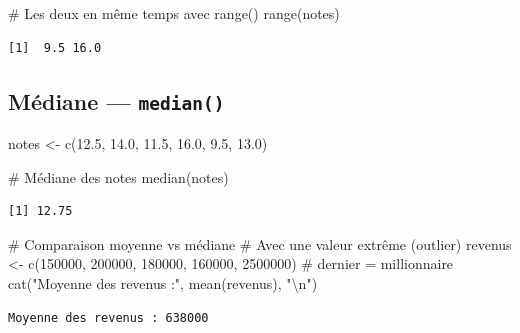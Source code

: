 \documentclass[
  french,
  11pt,
  a4paper,
]{article}
\newenvironment{Shaded}{}{}
\newcommand{\CommentTok}[1]{\textcolor[rgb]{0.42,0.45,0.49}{#1}}
\newcommand{\DecValTok}[1]{\textcolor[rgb]{0.00,0.36,0.77}{#1}}
\newcommand{\FloatTok}[1]{\textcolor[rgb]{0.00,0.36,0.77}{#1}}
\newcommand{\FunctionTok}[1]{\textcolor[rgb]{0.44,0.26,0.76}{#1}}
\newcommand{\NormalTok}[1]{\textcolor[rgb]{0.14,0.16,0.18}{#1}}
\newcommand{\OtherTok}[1]{\textcolor[rgb]{0.44,0.26,0.76}{#1}}
\newcommand{\SpecialCharTok}[1]{\textcolor[rgb]{0.00,0.36,0.77}{#1}}
\newcommand{\StringTok}[1]{\textcolor[rgb]{0.01,0.18,0.38}{#1}}
\begin{document}
\begin{Shaded}
\begin{Highlighting}[]
\CommentTok{\# Les deux en même temps avec range()}
\FunctionTok{range}\NormalTok{(notes)}
\end{Highlighting}
\end{Shaded}

\begin{verbatim}
[1]  9.5 16.0
\end{verbatim}

\subsection{\texorpdfstring{Médiane ---
\texttt{median()}}{Médiane --- median()}}\label{muxe9diane-median}

\begin{Shaded}
\begin{Highlighting}[]
\NormalTok{notes }\OtherTok{\textless{}{-}} \FunctionTok{c}\NormalTok{(}\FloatTok{12.5}\NormalTok{, }\FloatTok{14.0}\NormalTok{, }\FloatTok{11.5}\NormalTok{, }\FloatTok{16.0}\NormalTok{, }\FloatTok{9.5}\NormalTok{, }\FloatTok{13.0}\NormalTok{)}

\CommentTok{\# Médiane des notes}
\FunctionTok{median}\NormalTok{(notes)}
\end{Highlighting}
\end{Shaded}

\begin{verbatim}
[1] 12.75
\end{verbatim}

\begin{Shaded}
\begin{Highlighting}[]
\CommentTok{\# Comparaison moyenne vs médiane}
\CommentTok{\# Avec une valeur extrême (outlier)}
\NormalTok{revenus }\OtherTok{\textless{}{-}} \FunctionTok{c}\NormalTok{(}\DecValTok{150000}\NormalTok{, }\DecValTok{200000}\NormalTok{, }\DecValTok{180000}\NormalTok{, }\DecValTok{160000}\NormalTok{, }\DecValTok{2500000}\NormalTok{)  }\CommentTok{\# dernier = millionnaire}
\FunctionTok{cat}\NormalTok{(}\StringTok{"Moyenne des revenus :"}\NormalTok{, }\FunctionTok{mean}\NormalTok{(revenus), }\StringTok{"}\SpecialCharTok{\textbackslash{}n}\StringTok{"}\NormalTok{)}
\end{Highlighting}
\end{Shaded}

\begin{verbatim}
Moyenne des revenus : 638000 
\end{verbatim}
\end{document}
